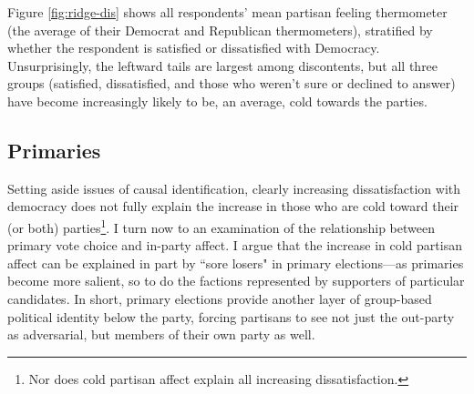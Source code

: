 \documentclass[12pt]{paper}
\begin{document}
Figure \ref{fig:ridge-dis} shows all respondents' mean partisan feeling thermometer (the average of their Democrat and Republican thermometers), stratified by whether the respondent is satisfied or dissatisfied with Democracy. Unsurprisingly, the leftward tails are largest among discontents, but all three groups (satisfied, dissatisfied, and those who weren't sure or declined to answer) have become increasingly likely to be, an average, cold towards the parties.

\subsection{Primaries}
Setting aside issues of causal identification, clearly increasing dissatisfaction with democracy does not fully explain  the increase in those who are cold toward their (or both) parties\footnote{Nor does cold partisan affect explain all increasing dissatisfaction.}. I turn now to an examination of the relationship between primary vote choice and in-party affect. I argue that the increase in cold partisan affect can be explained in part by ``sore losers" in primary elections---as primaries become more salient, so to do the factions represented by supporters of particular candidates. In short, primary elections provide another layer of group-based political identity below the party, forcing partisans to see not just the out-party as adversarial, but members of their own party as well.
\end{document}
